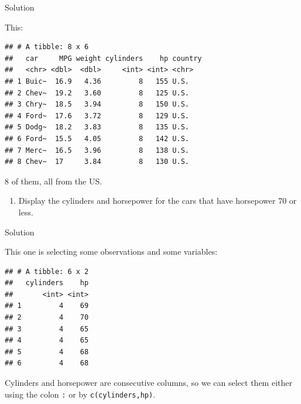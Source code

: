 \documentclass[]{tufte-book}
\newenvironment{Shaded}{}{}
\newcommand{\DecValTok}[1]{\textcolor[rgb]{0.25,0.63,0.44}{#1}}
\newcommand{\KeywordTok}[1]{\textcolor[rgb]{0.00,0.44,0.13}{\textbf{#1}}}
\newcommand{\NormalTok}[1]{#1}
\newcommand{\OperatorTok}[1]{\textcolor[rgb]{0.40,0.40,0.40}{#1}}
\newcommand{\StringTok}[1]{\textcolor[rgb]{0.25,0.44,0.63}{#1}}
\providecommand{\tightlist}{%
  \setlength{\itemsep}{0pt}\setlength{\parskip}{0pt}}
\theoremstyle{definition}
\theoremstyle{definition}
\theoremstyle{definition}
\theoremstyle{remark}
\begin{document}
Solution

This:

\begin{Shaded}
\end{Shaded}

\begin{verbatim}
## # A tibble: 8 x 6
##   car     MPG weight cylinders    hp country
##   <chr> <dbl>  <dbl>     <int> <int> <chr>  
## 1 Buic~  16.9   4.36         8   155 U.S.   
## 2 Chev~  19.2   3.60         8   125 U.S.   
## 3 Chry~  18.5   3.94         8   150 U.S.   
## 4 Ford~  17.6   3.72         8   129 U.S.   
## 5 Dodg~  18.2   3.83         8   135 U.S.   
## 6 Ford~  15.5   4.05         8   142 U.S.   
## 7 Merc~  16.5   3.96         8   138 U.S.   
## 8 Chev~  17     3.84         8   130 U.S.
\end{verbatim}

8 of them, all from the US.

\begin{enumerate}
\def\labelenumi{(\alph{enumi})}
\setcounter{enumi}{4}
\tightlist
\item
  Display the cylinders and horsepower for the cars that have horsepower
  70 or less.
\end{enumerate}

Solution

This one is selecting some observations and some variables:

\begin{Shaded}
\end{Shaded}

\begin{verbatim}
## # A tibble: 6 x 2
##   cylinders    hp
##       <int> <int>
## 1         4    69
## 2         4    70
## 3         4    65
## 4         4    65
## 5         4    68
## 6         4    68
\end{verbatim}

Cylinders and horsepower are consecutive columns, so we can select them
either using the colon \texttt{:} or by \texttt{c(cylinders,hp)}.
\end{document}

